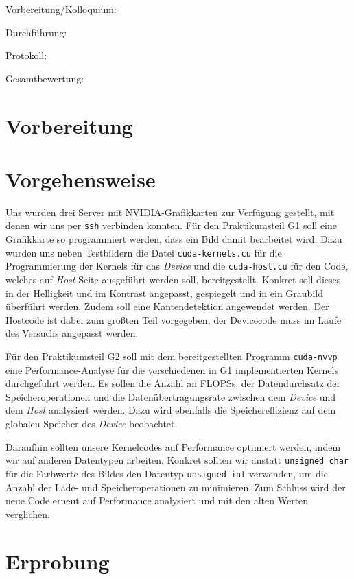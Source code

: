 \documentclass[12pt,a4paper]{scrartcl}
\begin{document}
Vorbereitung/Kolloquium:

Durchf\"uhrung:

Protokoll:

Gesamtbewertung:
\clearpage



\section{Vorbereitung}


\section{Vorgehensweise}
Uns wurden drei Server mit NVIDIA-Grafikkarten zur Verf\"ugung gestellt, mit denen wir uns per \texttt{ssh} verbinden konnten.
F\"ur den Praktikumsteil G1 soll eine Grafikkarte so programmiert werden, dass ein Bild damit bearbeitet wird.
Dazu wurden uns neben Testbildern die Datei \texttt{cuda-kernels.cu} f\"ur die Programmierung der Kernels f\"ur das \textit{Device} und die \texttt{cuda-host.cu} f\"ur den Code, welches auf \textit{Host}-Seite ausgef\"uhrt werden soll, bereitgestellt.
Konkret soll dieses in der Helligkeit und im Kontrast angepasst, gespiegelt und in ein Graubild \"uberf\"uhrt werden.
Zudem soll eine Kantendetektion angewendet werden.
Der Hostcode ist dabei zum gr\"o\ss ten Teil vorgegeben, der Devicecode muss im Laufe des Versuchs angepasst werden.

F\"ur den Praktikumsteil G2 soll mit dem bereitgestellten Programm \texttt{cuda-nvvp} eine Performance-Analyse f\"ur die verschiedenen in G1 implementierten Kernels durchgef\"uhrt werden.
Es sollen die Anzahl an FLOPSs, der Datendurchsatz der Speicheroperationen und die Daten\"ubertragungsrate zwischen dem \textit{Device} und dem \textit{Host} analysiert werden.
Dazu wird ebenfalls die Speichereffizienz auf dem globalen Speicher des \textit{Device} beobachtet.

Daraufhin sollten unsere Kernelcodes auf Performance optimiert werden, indem wir auf anderen Datentypen arbeiten.
Konkret sollten wir anstatt \texttt{unsigned char} f\"ur die Farbwerte des Bildes den Datentyp \texttt{unsigned int} verwenden, um die Anzahl der Lade- und Speicheroperationen zu minimieren.
Zum Schluss wird der neue Code erneut auf Performance analysiert und mit den alten Werten verglichen.
\section{Erprobung}
\end{document}

